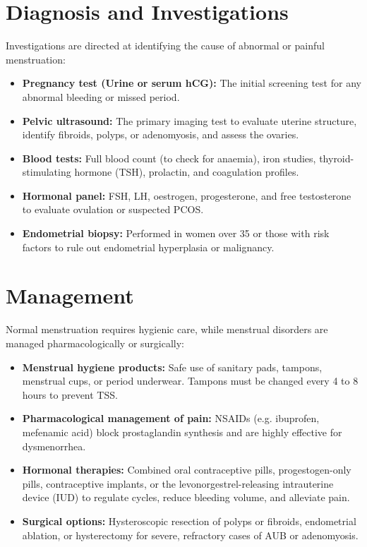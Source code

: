 \section*{Diagnosis and Investigations}
Investigations are directed at identifying the cause of abnormal or painful menstruation:
\begin{itemize}
    \item \textbf{Pregnancy test (Urine or serum hCG):} The initial screening test for any abnormal bleeding or missed period.
    \item \textbf{Pelvic ultrasound:} The primary imaging test to evaluate uterine structure, identify fibroids, polyps, or adenomyosis, and assess the ovaries.
    \item \textbf{Blood tests:} Full blood count (to check for anaemia), iron studies, thyroid-stimulating hormone (TSH), prolactin, and coagulation profiles.
    \item \textbf{Hormonal panel:} FSH, LH, oestrogen, progesterone, and free testosterone to evaluate ovulation or suspected PCOS.
    \item \textbf{Endometrial biopsy:} Performed in women over 35 or those with risk factors to rule out endometrial hyperplasia or malignancy.
\end{itemize}

\section*{Management}
Normal menstruation requires hygienic care, while menstrual disorders are managed pharmacologically or surgically:
\begin{itemize}
    \item \textbf{Menstrual hygiene products:} Safe use of sanitary pads, tampons, menstrual cups, or period underwear. Tampons must be changed every 4 to 8 hours to prevent TSS.
    \item \textbf{Pharmacological management of pain:} NSAIDs (e.g. ibuprofen, mefenamic acid) block prostaglandin synthesis and are highly effective for dysmenorrhea.
    \item \textbf{Hormonal therapies:} Combined oral contraceptive pills, progestogen-only pills, contraceptive implants, or the levonorgestrel-releasing intrauterine device (IUD) to regulate cycles, reduce bleeding volume, and alleviate pain.
    \item \textbf{Surgical options:} Hysteroscopic resection of polyps or fibroids, endometrial ablation, or hysterectomy for severe, refractory cases of AUB or adenomyosis.
\end{itemize}

